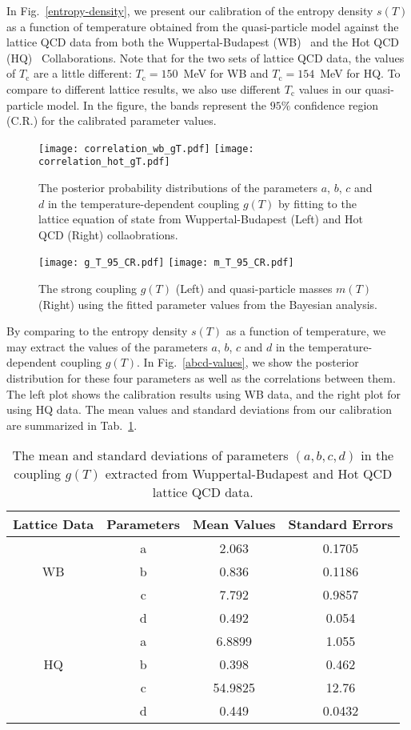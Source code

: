 \documentclass[aps,superscriptaddress,prc,twocolumn,nofootinbib]{revtex4}
\begin{document}
In Fig.~\ref{entropy-density}, we present our calibration of the entropy density $s(T)$ as a function of temperature obtained from the quasi-particle model against the lattice QCD data from both the Wuppertal-Budapest (WB)~\cite{Borsanyi:2013bia} and the Hot QCD (HQ)~\cite{Bazavov:2014pvz} Collaborations. Note that for the two sets of lattice QCD data, the values of $T_\mathrm{c}$ are a little different: $T_\mathrm{c} = 150$~MeV for WB and $T_\mathrm{c} = 154$~MeV for HQ. To compare to different lattice results, we also use different $T_\mathrm{c}$ values in our quasi-particle model. In the figure, the bands represent the $95\%$ confidence region (C.R.) for the calibrated parameter values.


\begin{figure*}[tbh]
\texttt{[image: correlation\_wb\_gT.pdf]}
\texttt{[image: correlation\_hot\_gT.pdf]}
\caption{The posterior probability distributions of the parameters $a$, $b$, $c$ and $d$ in the temperature-dependent coupling $g(T)$ by fitting to the lattice equation of state from Wuppertal-Budapest (Left) and Hot QCD (Right) collaobrations.}
	\label{abcd-values}
\vspace{12pt}
\texttt{[image: g\_T\_95\_CR.pdf]}
\texttt{[image: m\_T\_95\_CR.pdf]}
	\caption{The strong coupling $g(T)$ (Left) and quasi-particle masses $m(T)$ (Right) using the fitted parameter values from the Bayesian analysis.}
	\label{gT-mT}
\end{figure*}


By comparing to the entropy density $s(T)$ as a function of temperature, we may extract the values of the parameters $a$, $b$, $c$ and $d$ in the temperature-dependent coupling $g(T)$. In Fig.~\ref{abcd-values}, we show the posterior distribution for these four parameters as well as the correlations between them. The left plot shows the calibration results using WB data, and the right plot for using HQ data.
The mean values and standard deviations from our calibration are summarized in Tab.~\ref{tab:2}.


\begin{table}[htb]
\label{tab:2}
\centering
\vspace{-5pt}
\begin{tabular}{c|c|c|c}
 \hline
 Lattice Data & Parameters & Mean Values & Standard Errors  \\
 \hline
    & a & 2.063 & 0.1705    \\
  WB   & b & 0.836 & 0.1186   \\
      & c & 7.792 & 0.9857   \\
      & d & 0.492 & 0.054   \\ \hline
   & a & 6.8899 & 1.055   \\
  HQ   & b & 0.398 & 0.462  \\
  	  & c & 54.9825 & 12.76  \\
  	  & d & 0.449 & 0.0432   \\
  \hline
\end{tabular}
	\caption{The mean and standard deviations of parameters $(a,b,c,d)$ in the coupling $g(T)$ extracted from Wuppertal-Budapest and Hot QCD lattice QCD data.}
\end{table}
\end{document}

